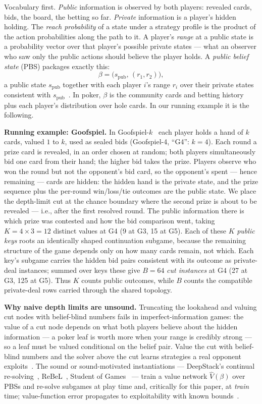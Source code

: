 \documentclass[11pt]{article}
\begin{document}
Vocabulary first. \emph{Public} information is observed by both players: revealed cards,
bids, the board, the betting so far. \emph{Private} information is a player's hidden
holding. The \emph{reach probability} of a state under a strategy profile is the product
of the action probabilities along the path to it. A player's \emph{range} at a public
state is a probability vector over that player's possible private states --- what an
observer who saw only the public actions should believe the player holds. A \emph{public
belief state} (PBS) packages exactly this:
\[ \beta = \big(s_{\text{pub}},\, (r_1, r_2)\big), \]
a public state $s_{\text{pub}}$ together with each player $i$'s range $r_i$ over their
private states consistent with $s_{\text{pub}}$~\citep{Brown2020}. In poker, $\beta$ is
the community cards and betting history plus each player's distribution over hole cards.
In our running example it is the following.

\textbf{Running example: Goofspiel.} In Goofspiel-$k$~\citep{Ross1971} each player holds
a hand of $k$ cards, valued $1$ to $k$, used as sealed bids (Goofspiel-4, ``G4'': $k =
4$). Each round a prize card is revealed, in an order chosen at random; both players
simultaneously bid one card from their hand; the higher bid takes the prize. Players
observe who won the round but not the opponent's bid card, so the opponent's spent ---
hence remaining --- cards are hidden: the hidden hand is the private state, and the
prize sequence plus the per-round win/loss/tie outcomes are the public state. We place
the depth-limit cut at the chance boundary where the second prize is about to be
revealed --- i.e., after the first resolved round. The public information there is which
prize was contested and how the bid comparison went, taking $K = 4 \times 3 = 12$
distinct values at G4 (9 at G3, 15 at G5). Each of these $K$ \emph{public keys} roots an
identically shaped continuation subgame, because the remaining structure of the game
depends only on how many cards remain, not which. Each key's subgame carries the hidden
bid pairs consistent with its outcome as private-deal instances; summed over keys these
give $B = 64$ \emph{cut instances} at G4 (27 at G3, 125 at G5). Thus $K$ counts public
outcomes, while $B$ counts the compatible private-deal rows carried through the shared
topology.

\textbf{Why naive depth limits are unsound.} Truncating the lookahead and valuing cut
nodes with belief-blind numbers fails in imperfect-information games: the value of a cut
node depends on what both players believe about the hidden information --- a poker leaf
is worth more when your range is credibly strong --- so a leaf must be valued
conditional on the belief pair. Value the cut with belief-blind numbers and the solver
above the cut learns strategies a real opponent exploits~\citep{BrownSandholm2018}. The
sound or sound-motivated instantiations --- DeepStack's continual
re-solving~\citep{Moravcik2017},
ReBeL~\citep{Brown2020}, Student of Games~\citep{Schmid2023} --- train a value network
$\hat V(\beta)$ over PBSs and re-solve subgames at play time and, critically for this
paper, at \emph{train} time; value-function error propagates to exploitability with
known bounds~\citep{KovarikLisy2019}.
\end{document}
